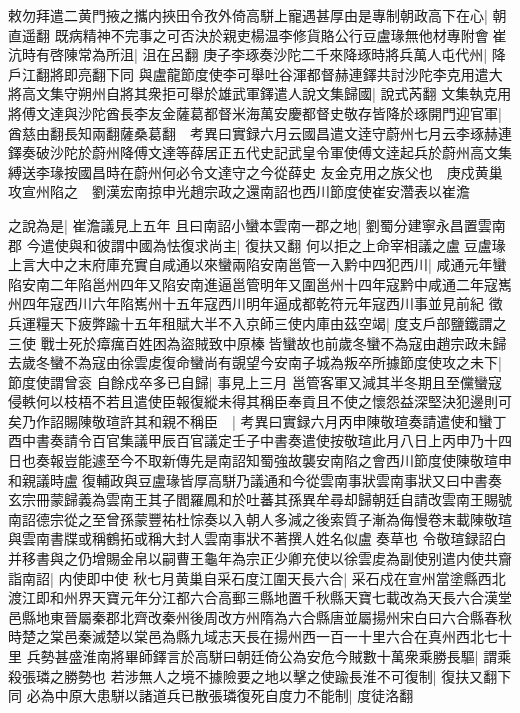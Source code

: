 敕勿拜遣二黄門掖之攜内挾田令孜外倚高駢上寵遇甚厚由是專制朝政高下在心|{
	朝直遥翻}
既病精神不完事之可否決於親吏楊温李修貨賂公行豆盧瑑無他材專附會崔沆時有啓陳常為所沮|{
	沮在呂翻}
庚子李琢奏沙陀二千來降琢時將兵萬人屯代州|{
	降戶江翻將即亮翻下同}
與盧龍節度使李可舉吐谷渾都督赫連鐸共討沙陀李克用遣大將高文集守朔州自將其衆拒可舉於雄武軍鐸遣人說文集歸國|{
	說式芮翻}
文集執克用將傅文達與沙陀酋長李友金薩葛都督米海萬安慶都督史敬存皆降於琢開門迎官軍|{
	酋慈由翻長知兩翻薩桑葛翻　考異曰實録六月云國昌遣文逹守蔚州七月云李琢赫連鐸奏破沙陀於蔚州降傅文達等薛居正五代史記武皇令軍使傅文逹起兵於蔚州高文集縛送李瑑按國昌時在蔚州何必令文達守之今從薛史}
友金克用之族父也　庚戍黄巢攻宣州陷之　劉漢宏南掠申光趙宗政之還南詔也西川節度使崔安濳表以崔澹

之說為是|{
	崔澹議見上五年}
且曰南詔小蠻本雲南一郡之地|{
	劉蜀分建寧永昌置雲南郡}
今遣使與和彼謂中國為怯復求尚主|{
	復扶又翻}
何以拒之上命宰相議之盧豆盧瑑上言大中之末府庫充實自咸通以來蠻兩陷安南邕管一入黔中四犯西川|{
	咸通元年蠻陷安南二年陷邕州四年又陷安南進逼邕管明年又圍邕州十四年寇黔中咸通二年寇嶲州四年寇西川六年陷嶲州十五年寇西川明年逼成都乾符元年寇西川事並見前紀}
徵兵運糧天下疲弊踰十五年租賦大半不入京師三使内庫由茲空竭|{
	度支戶部鹽鐵謂之三使}
戰士死於瘴癘百姓困為盜賊致中原榛皆蠻故也前歲冬蠻不為寇由趙宗政未歸去歲冬蠻不為寇由徐雲䖍復命蠻尚有覬望今安南子城為叛卒所據節度使攻之未下|{
	節度使謂曾衮}
自餘戍卒多已自歸|{
	事見上三月}
邕管客軍又減其半冬期且至儻蠻寇侵軼何以枝梧不若且遣使臣報復縱未得其稱臣奉貢且不使之懷怨益深堅決犯邊則可矣乃作詔賜陳敬瑄許其和親不稱臣　|{
	考異曰實録六月丙申陳敬瑄奏請遣使和蠻丁酉中書奏請令百官集議甲辰百官議定壬子中書奏遣使按敬瑄此月八日上丙申乃十四日也奏報豈能遽至今不取新傳先是南詔知蜀強故襲安南陷之會西川節度使陳敬瑄申和親議時盧復輔政與豆盧瑑皆厚高駢乃議通和今從雲南事狀雲南事狀又曰中書奏玄宗冊蒙歸義為雲南王其子閻羅鳳和於吐蕃其孫異牟尋却歸朝廷自請改雲南王賜號南詔德宗從之至曾孫蒙豐祐杜悰奏以入朝人多減之後索質子漸為侮慢卷末載陳敬瑄與雲南書牒或稱鶴拓或稱大封人雲南事狀不著撰人姓名似盧奏草也}
令敬瑄録詔白并移書與之仍增賜金帛以嗣曹王龜年為宗正少卿充使以徐雲䖍為副使别遣内使共齎詣南詔|{
	内使即中使}
秋七月黄巢自采石度江圍天長六合|{
	采石戍在宣州當塗縣西北渡江即和州界天寶元年分江都六合高郵三縣地置千秋縣天寶七載改為天長六合漢堂邑縣地東晉屬秦郡北齊改秦州後周改方州隋為六合縣唐並屬揚州宋白曰六合縣春秋時楚之棠邑秦滅楚以棠邑為縣九域志天長在揚州西一百一十里六合在真州西北七十里}
兵勢甚盛淮南將畢師鐸言於高駢曰朝廷倚公為安危今賊數十萬衆乘勝長驅|{
	謂乘殺張璘之勝勢也}
若涉無人之境不據險要之地以擊之使踰長淮不可復制|{
	復扶又翻下同}
必為中原大患駢以諸道兵已散張璘復死自度力不能制|{
	度徒洛翻}
